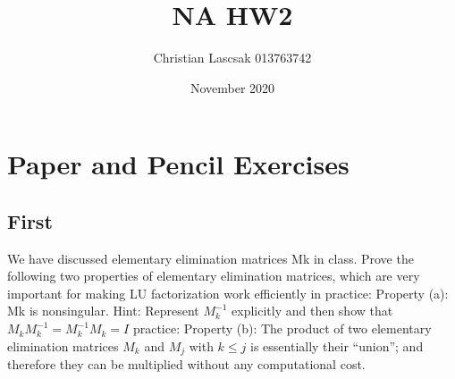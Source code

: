 \documentclass{article}
\title{NA HW2}
\author{Christian Lascsak 013763742}
\date{November 2020}
\begin{document}
\maketitle

\section{Paper and Pencil Exercises}
\subsection{First}
We have discussed elementary elimination matrices Mk in class. Prove the
following two properties of elementary elimination matrices, which are very important for
making LU factorization work efficiently in practice:\newline
Property (a): Mk is nonsingular.
Hint: Represent \(M_k^{-1}\)
explicitly and then show that \(M_k M_k^{-1} = M_k^{-1} M_k = I\)
\newline
practice:\newline
Property (b): The product of two elementary elimination matrices \(M_k\) and \(M_j\) with \(k \leq j\) is essentially their “union”; and therefore they can be multiplied without any computational
cost.
\end{document}
